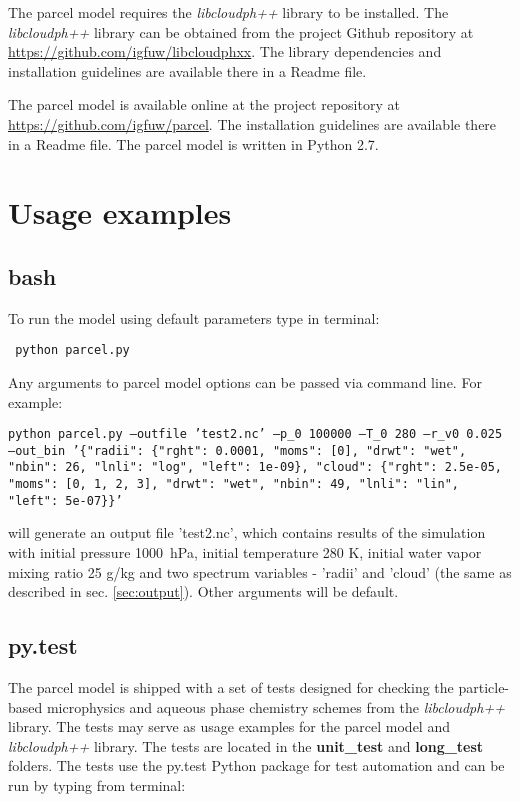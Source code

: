 \documentclass[11pt]{article}
\newcommand{\prog}[1]{{\tt#1}}
\begin{document}
The parcel model requires the \emph{libcloudph++} library to be installed. 
The \emph{libcloudph++} library can be obtained from the project Github repository 
  at \url{https://github.com/igfuw/libcloudphxx}.
The library dependencies and installation guidelines are available there in a Readme file.

The parcel model is available online at the project repository at \url{https://github.com/igfuw/parcel}.
The installation guidelines are available there in a Readme file.
The parcel model is written in Python 2.7.

\section{Usage examples}

\subsection{bash}

\noindent
To run the model using default parameters type in terminal:

\vspace{0.35cm}
  \prog{ python parcel.py}
\vspace{0.35cm}

\noindent
Any arguments to parcel model options can be passed via command line. For example:

\vspace{0.35cm}
 \prog{python parcel.py \texttt{--}outfile 'test2.nc' \texttt{--}p\_0 100000 \texttt{--}T\_0 280 \texttt{--}r\_v0 0.025 \texttt{--}out\_bin '\{"radii": \{"rght": 0.0001,  "moms": [0], "drwt": "wet", "nbin": 26, "lnli": "log", "left": 1e-09\}, "cloud": \{"rght": 2.5e-05, "moms": [0, 1, 2, 3], "drwt": "wet", "nbin": 49, "lnli": "lin", "left": 5e-07\}\}'}
\vspace{0.35cm}

\noindent
will generate an output file 'test2.nc', which contains results of the simulation with initial pressure 1000~hPa, initial temperature 280 K, initial water vapor mixing ratio 25 g/kg and two spectrum variables - 'radii' and 'cloud' (the same as described in sec. \ref{sec:output}). Other arguments will be default.

\subsection{py.test}

The parcel model is shipped with a set of tests designed for checking the particle-based microphysics 
  and aqueous phase chemistry schemes from the \emph{libcloudph++} library.
The tests may serve as usage examples for the parcel model and \emph{libcloudph++} library.
The tests are located in the {\bf unit\_test} and {\bf long\_test} folders.
The tests use the py.test Python package for test automation and can be run by typing from terminal:\\
\end{document}
